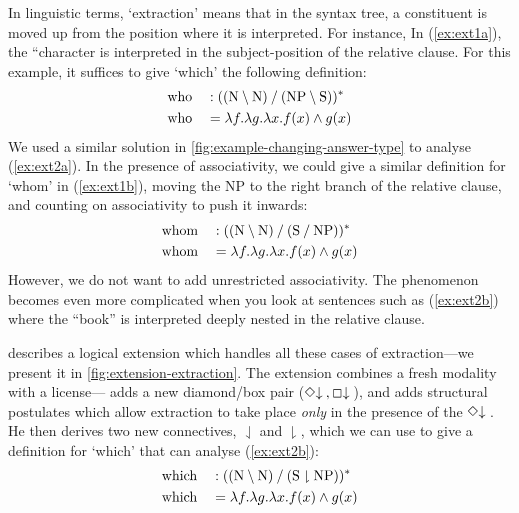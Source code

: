 In linguistic terms, `extraction' means that in the syntax tree, a
constituent is moved up from the position where it is interpreted. For
instance,
In (\ref{ex:ext1a}), the ``character is interpreted in the
subject-position of the relative clause. For this example, it suffices
to give `which' the following definition:
\begin{alignat*}{3}
  &\text{who} &&: \tr[((\N\impr\N)\impl(\NP\impr\S))]\\
  &\text{who} &&= \lambda{f}.\lambda{g}.\lambda{x}.f(x)\wedge g(x)
\end{alignat*}
We used a similar solution in
\autoref{fig:example-changing-answer-type} to analyse (\ref{ex:ext2a}).
In the presence of associativity, we could give a similar definition
for `whom' in (\ref{ex:ext1b}), moving the NP to the right branch of
the relative clause, and counting on associativity to push it inwards:
\begin{alignat*}{3}
  &\text{whom} &&: \tr[((\N\impr\N)\impl(\S\impl\NP))]\\
  &\text{whom} &&= \lambda{f}.\lambda{g}.\lambda{x}.f(x)\wedge g(x)
\end{alignat*}
However, we do not want to add unrestricted associativity. The
phenomenon becomes even more complicated when you look at sentences
such as  (\ref{ex:ext2b}) where the ``book'' is interpreted deeply
nested in the relative clause.

\citet{moortgat1999b} describes a logical extension which handles all
these cases of extraction---we present it in
\autoref{fig:extension-extraction}.
The extension combines a fresh modality with a
license---\citet{moortgat1999b} adds a new diamond/box pair
($\diDn,\sqDn$), and adds structural postulates which allow extraction
to take place \emph{only} in the presence of the $\diDn$.
He then derives two new connectives, $\downharpoonleft$ and
$\downharpoonright$, which we can use to give a definition for
`which' that can analyse (\ref{ex:ext2b}):
\begin{alignat*}{3}
  &\text{which} &&: \tr[((\N\impr\N)\impl(\S\downharpoonright\NP))]\\
  &\text{which} &&= \lambda{f}.\lambda{g}.\lambda{x}.f(x)\wedge g(x)
\end{alignat*}

